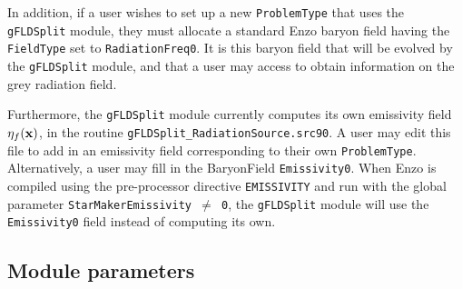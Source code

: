 \documentclass[letterpaper,10pt]{article}
\renewcommand{\(}{\left(}
\renewcommand{\)}{\right)}
\newcommand{\xvec}{{\bf x}}
\begin{document}
In addition, if a user wishes to set up a new {\tt ProblemType} that
uses the {\tt gFLDSplit} module, they must allocate a standard Enzo
baryon field having the {\tt FieldType} set to {\tt RadiationFreq0}.
It is this baryon field that will be evolved by the {\tt gFLDSplit}
module, and that a user may access to obtain information on the
grey radiation field. 

Furthermore, the {\tt gFLDSplit} module currently computes its own
emissivity field $\eta_f(\xvec)$, in the routine 
{\tt gFLDSplit\_RadiationSource.src90}.  A user may edit this file
to add in an emissivity field corresponding to their own 
{\tt ProblemType}.  Alternatively, a user may fill in the 
BaryonField {\tt Emissivity0}.  When Enzo is compiled using the
pre-processor directive {\tt EMISSIVITY} and run with the global
parameter {\tt StarMakerEmissivity $\ne$ 0}, the {\tt gFLDSplit}
module will use the {\tt Emissivity0} field instead of computing its
own. 



\subsection{Module parameters}
\end{document}
